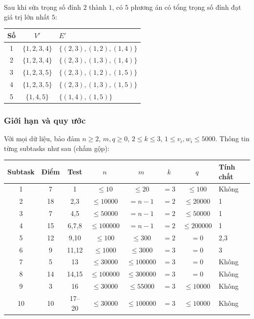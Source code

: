 \documentclass[11pt]{article}
\begin{document}
Sau khi sửa trọng số đỉnh \(2\) thành \(1\), có \(5\) phương án có tổng trọng
số đỉnh đạt giá trị lớn nhất \(5\):

\begin{center}
\small
\begin{tabular}{c c l}
\textbf{Số} & \(V'\) & \(E'\)\\
\hline
1 & \(\{1,2,3,4\}\) & \(\{(2,3),(1,2),(1,4)\}\)\\
2 & \(\{1,2,3,4\}\) & \(\{(2,3),(1,3),(1,4)\}\)\\
3 & \(\{1,2,3,5\}\) & \(\{(2,3),(1,2),(1,5)\}\)\\
4 & \(\{1,2,3,5\}\) & \(\{(2,3),(1,3),(1,5)\}\)\\
5 & \(\{1,4,5\}\) & \(\{(1,4),(1,5)\}\)
\end{tabular}
\end{center}

\subsubsection{Giới hạn và quy ước}

Với mọi dữ liệu, bảo đảm \(n\ge 2\), \(m,q\ge 0\), \(2\le k\le 3\),
\(1\le v_i,w_i\le 5000\). Thông tin từng subtasks như sau (chấm gộp):

\begin{center}
\small
\begin{tabular}{c c c c c c c l}
\textbf{Subtask} & \textbf{Điểm} & \textbf{Test} & \(n\) & \(m\) & \(k\) & \(q\) & \textbf{Tính chất}\\
\hline
1 & 7 & 1 & \(\le 10\) & \(\le 20\) & \(=3\) & \(\le 100\) & Không\\
2 & 18 & 2,3 & \(\le 10000\) & \(=n-1\) & \(=2\) & \(\le 20000\) & 1\\
3 & 7 & 4,5 & \(\le 50000\) & \(=n-1\) & \(=2\) & \(\le 50000\) & 1\\
4 & 15 & 6,7,8 & \(\le 100000\) & \(=n-1\) & \(=2\) & \(\le 200000\) & 1\\
5 & 12 & 9,10 & \(\le 100\) & \(\le 300\) & \(=2\) & \(=0\) & 2,3\\
6 & 9 & 11,12 & \(\le 1000\) & \(\le 3000\) & \(=3\) & \(=0\) & 3\\
7 & 5 & 13 & \(\le 30000\) & \(\le 100000\) & \(=3\) & \(=0\) & Không\\
8 & 14 & 14,15 & \(\le 100000\) & \(\le 300000\) & \(=3\) & \(=0\) & Không\\
9 & 3 & 16 & \(\le 30000\) & \(\le 55000\) & \(=3\) & \(\le 10000\) & Không\\
10 & 10 & 17--20 & \(\le 30000\) & \(\le 100000\) & \(=3\) & \(\le 10000\) & Không
\end{tabular}
\end{center}
\end{document}
